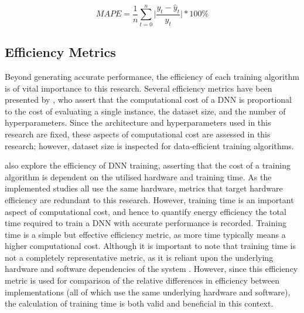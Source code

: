 \documentclass[a4paper, 11pt]{report}
\begin{document}
    \begin{equation}
        \label{eq: mape}
        MAPE = \frac{1}{n} \sum_{t=0}^n \bigg\lvert \frac{y_t - \hat{y}_t}{y_t} \bigg\lvert * 100\%
    \end{equation}


    \subsection{Efficiency Metrics}
    \label{section: efficiency-metrics}

    Beyond generating accurate performance, the efficiency of each training algorithm is of vital importance to this research. Several efficiency metrics have been presented by \citet{schwartz-2019}, who assert that the computational cost of a DNN is proportional to the cost of evaluating a single instance, the dataset size, and the number of hyperparameters. Since the architecture and hyperparameters used in this research are fixed, these aspects of computational cost are assessed in this research; however, dataset size is inspected for data-efficient training algorithms.

    \citet{amodei-2018} also explore the efficiency of DNN training, asserting that the cost of a training algorithm is dependent on the utilised hardware and training time. As the implemented studies all use the same hardware, metrics that target hardware efficiency are redundant to this research. However, training time is an important aspect of computational cost, and hence to quantify energy efficiency the total time required to train a DNN with accurate performance is recorded. Training time is a simple but effective efficiency metric, as more time typically means a higher computational cost. Although it is important to note that training time is not a completely representative metric, as it is reliant upon the underlying hardware and software dependencies of the system \citep{schwartz-2019}. However, since this efficiency metric is used for comparison of the relative differences in efficiency between implementations (all of which use the same underlying hardware and software), the calculation of training time is both valid and beneficial in this context.
\end{document}
